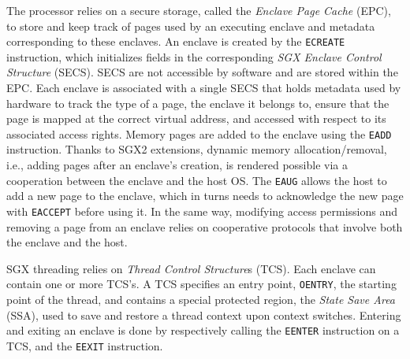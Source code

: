 
The processor relies on a secure storage, called the \emph{Enclave Page Cache} (EPC), to store and keep track of pages used by an executing enclave and metadata corresponding to these enclaves.
An enclave is created by the \lstinline{ECREATE} instruction, which initializes fields in the corresponding \emph{SGX Enclave Control Structure} (SECS).
SECS are not accessible by software and are stored within the EPC.
Each enclave is associated with a single SECS that holds metadata used by hardware to track the type of a page, the enclave it belongs to, ensure that the page is mapped at the correct virtual address, and accessed with respect to its associated access rights.
Memory pages are added to the enclave using the \lstinline{EADD} instruction.
Thanks to SGX2 extensions, dynamic memory allocation/removal, i.e., adding pages after an enclave's creation, is rendered possible via a cooperation between the enclave and the host OS.
The \lstinline{EAUG} allows the host to add a new page to the enclave, which in turns needs to acknowledge the new page with \lstinline{EACCEPT} before using it.
In the same way, modifying access permissions and removing a page from an enclave relies on cooperative protocols that involve both the enclave and the host.

SGX threading relies on \emph{Thread Control Structure}s (TCS).
Each enclave can contain one or more TCS's.
A TCS specifies an entry point, \lstinline{OENTRY}, the starting point of the thread, and contains a special protected region, the \emph{State Save Area} (SSA), used to save and restore a thread context upon context switches.
Entering and exiting an enclave is done by respectively calling the \lstinline{EENTER} instruction on a TCS, and the \lstinline{EEXIT} instruction.

